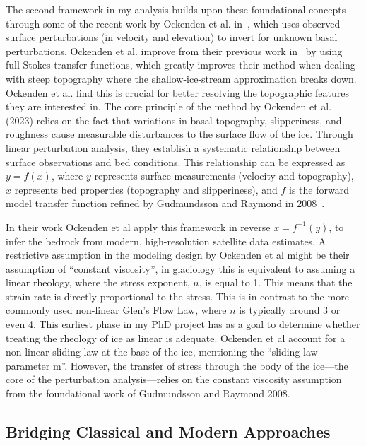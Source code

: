 The second framework in my analysis builds upon these foundational concepts through some of the recent work by Ockenden et al. in~\cite{Ockenden_2023}, which uses observed surface perturbations (in velocity and elevation) to invert for unknown basal perturbations. Ockenden et al. improve from their previous work in~\cite{Ockenden_2022} by using full-Stokes transfer functions, which greatly improves their method when dealing with steep topography where the shallow-ice-stream approximation breaks down. Ockenden et al. find this is crucial for better resolving the topographic features they are interested in. The core principle of the method by Ockenden et al. (2023) relies on the fact that variations in basal topography, slipperiness, and roughness cause measurable disturbances to the surface flow of the ice. Through linear perturbation analysis, they establish a systematic relationship between surface observations and bed conditions. This relationship can be expressed as $y=f(x)$, where $y$ represents surface measurements (velocity and topography), $x$ represents bed properties (topography and slipperiness), and $f$ is the forward model transfer function refined by Gudmundsson and Raymond in 2008~\cite{Gudmundsson_2008}. 

In their work Ockenden et al apply this framework in reverse $x=f^{-1}(y)$, to infer the bedrock from modern, high-resolution satellite data estimates. A restrictive assumption in the modeling design by Ockenden et al might be their assumption of ``constant viscosity'', in glaciology this is equivalent to assuming a linear rheology, where the stress exponent, $n$, is equal to 1. This means that the strain rate is directly proportional to the stress. This is in contrast to the more commonly used non-linear Glen's Flow Law, where $n$ is typically around 3 or even 4. This earliest phase in my PhD project has as a goal to determine whether treating the rheology of ice as  linear is adequate. Ockenden et al account for a non-linear sliding law at the base of the ice, mentioning the ``sliding law parameter m''. However, the transfer of stress through the body of the ice—the core of the perturbation analysis—relies on the constant viscosity assumption from the foundational work of Gudmundsson and Raymond 2008.


\subsection{Bridging Classical and Modern Approaches}

